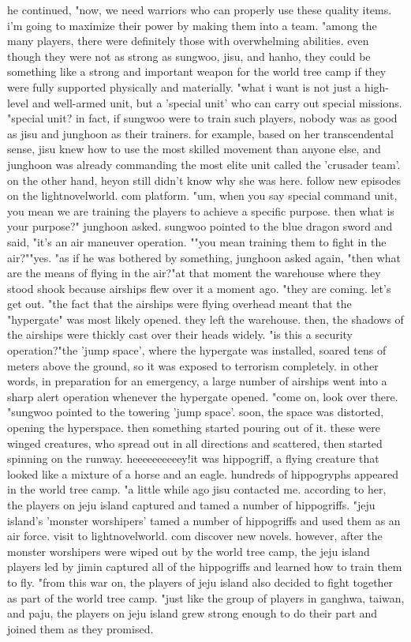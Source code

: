 he continued, "now, we need warriors who can properly use these quality items.
 i'm going to maximize their power by making them into a team.
"among the many players, there were definitely those with overwhelming abilities.
even though they were not as strong as sungwoo, jisu, and hanho, they could be something like a strong and important weapon for the world tree camp if they were fully supported physically and materially.
"what i want is not just a high-level and well-armed unit, but a 'special unit' who can carry out special missions.
"special unit? in fact, if sungwoo were to train such players, nobody was as good as jisu and junghoon as their trainers.
for example, based on her transcendental sense, jisu knew how to use the most skilled movement than anyone else, and junghoon was already commanding the most elite unit called the 'crusader team'.
 on the other hand, heyon still didn't know why she was here.
follow new episodes on the lightnov­elworld.
com platform.
"um, when you say special command unit, you mean we are training the players to achieve a specific purpose.
 then what is your purpose?" junghoon asked.
 sungwoo pointed to the blue dragon sword and said, "it's an air maneuver operation.
""you mean training them to fight in the air?""yes.
"as if he was bothered by something, junghoon asked again, "then what are the means of flying in the air?"at that moment the warehouse where they stood shook because airships flew over it a moment ago.
"they are coming.
 let's get out.
"the fact that the airships were flying overhead meant that the "hypergate" was most likely opened.
 they left the warehouse.
 then, the shadows of the airships were thickly cast over their heads widely.
"is this a security operation?"the 'jump space', where the hypergate was installed, soared tens of meters above the ground, so it was exposed to terrorism completely.
 in other words, in preparation for an emergency, a large number of airships went into a sharp alert operation whenever the hypergate opened.
 "come on, look over there.
"sungwoo pointed to the towering 'jump space'.
 soon, the space was distorted, opening the hyperspace.
 then something started pouring out of it.
 these were winged creatures, who spread out in all directions and scattered, then started spinning on the runway.
heeeeeeeeeey!it was hippogriff, a flying creature that looked like a mixture of a horse and an eagle.
hundreds of hippogryphs appeared in the world tree camp.
"a little while ago jisu contacted me.
 according to her, the players on jeju island captured and tamed a number of hippogriffs.
"jeju island's 'monster worshipers' tamed a number of hippogriffs and used them as an air force.
visit to lightnovelworld.
c­om discover new novels.
however, after the monster worshipers were wiped out by the world tree camp, the jeju island players led by jimin captured all of the hippogriffs and learned how to train them to fly.
 "from this war on, the players of jeju island also decided to fight together as part of the world tree camp.
"just like the group of players in ganghwa, taiwan, and paju, the players on jeju island grew strong enough to do their part and joined them as they promised.


